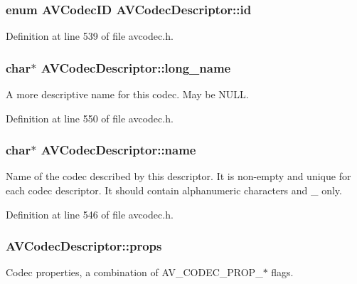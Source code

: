 \subsubsection[{\texorpdfstring{id}{id}}]{\setlength{\rightskip}{0pt plus 5cm}enum {\bf A\+V\+Codec\+ID} A\+V\+Codec\+Descriptor\+::id}\hypertarget{struct_a_v_codec_descriptor_ab7ba57d70e9d4d50bba20c778c09d069}{}\label{struct_a_v_codec_descriptor_ab7ba57d70e9d4d50bba20c778c09d069}


Definition at line 539 of file avcodec.\+h.

\subsubsection[{\texorpdfstring{long\+\_\+name}{long_name}}]{ char$\ast$ A\+V\+Codec\+Descriptor\+::long\+\_\+name}\hypertarget{struct_a_v_codec_descriptor_a31fa9d4fed68cfe8a128d461ec2d3e20}{}\label{struct_a_v_codec_descriptor_a31fa9d4fed68cfe8a128d461ec2d3e20}
A more descriptive name for this codec. May be N\+U\+LL. 

Definition at line 550 of file avcodec.\+h.

\subsubsection[{\texorpdfstring{name}{name}}]{ char$\ast$ A\+V\+Codec\+Descriptor\+::name}\hypertarget{struct_a_v_codec_descriptor_a955dba1de947abbed22d28682b0db516}{}\label{struct_a_v_codec_descriptor_a955dba1de947abbed22d28682b0db516}
Name of the codec described by this descriptor. It is non-\/empty and unique for each codec descriptor. It should contain alphanumeric characters and \textquotesingle{}\+\_\+\textquotesingle{} only. 

Definition at line 546 of file avcodec.\+h.

\subsubsection[{\texorpdfstring{props}{props}}]{ A\+V\+Codec\+Descriptor\+::props}\hypertarget{struct_a_v_codec_descriptor_a9949288403a12812cd6e3892ac45f40f}{}\label{struct_a_v_codec_descriptor_a9949288403a12812cd6e3892ac45f40f}
Codec properties, a combination of A\+V\+\_\+\+C\+O\+D\+E\+C\+\_\+\+P\+R\+O\+P\+\_\+$\ast$ flags. 

